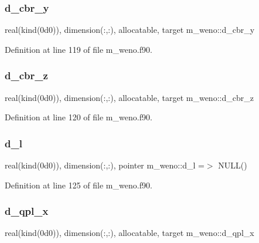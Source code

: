 \subsubsection{\texorpdfstring{d\+\_\+cbr\+\_\+y}{d\_cbr\_y}}
{\footnotesize\ttfamily real(kind(0d0)), dimension(\+:,\+:), allocatable, target m\+\_\+weno\+::d\+\_\+cbr\+\_\+y}



Definition at line 119 of file m\+\_\+weno.\+f90.

\mbox{\label{namespacem__weno_a02d6127ab8eaea07640ccfcdc516e5c4}} 
\subsubsection{\texorpdfstring{d\+\_\+cbr\+\_\+z}{d\_cbr\_z}}
{\footnotesize\ttfamily real(kind(0d0)), dimension(\+:,\+:), allocatable, target m\+\_\+weno\+::d\+\_\+cbr\+\_\+z}



Definition at line 120 of file m\+\_\+weno.\+f90.

\mbox{\label{namespacem__weno_ab020cbb64bcbdee4c70f6eee10d5d064}} 
\subsubsection{\texorpdfstring{d\+\_\+l}{d\_l}}
{\footnotesize\ttfamily real(kind(0d0)), dimension(\+:,\+:), pointer m\+\_\+weno\+::d\+\_\+l =$>$ N\+U\+LL()}



Definition at line 125 of file m\+\_\+weno.\+f90.

\mbox{\label{namespacem__weno_abbcb8241757105e94347691a4b578e18}} 
\subsubsection{\texorpdfstring{d\+\_\+qpl\+\_\+x}{d\_qpl\_x}}
{\footnotesize\ttfamily real(kind(0d0)), dimension(\+:,\+:), allocatable, target m\+\_\+weno\+::d\+\_\+qpl\+\_\+x}



